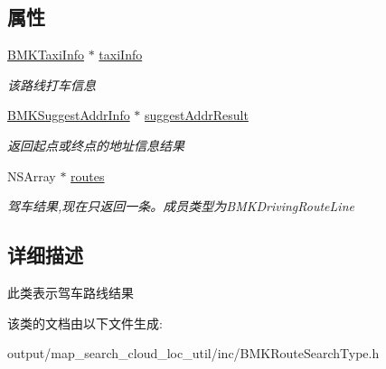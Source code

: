 \subsection*{属性}
\begin{DoxyCompactItemize}
\item 
\hypertarget{interface_b_m_k_driving_route_result_a4dc537f67ed47de78ac3bcda172397dd}{\hyperlink{interface_b_m_k_taxi_info}{B\+M\+K\+Taxi\+Info} $\ast$ \hyperlink{interface_b_m_k_driving_route_result_a4dc537f67ed47de78ac3bcda172397dd}{taxi\+Info}}\label{interface_b_m_k_driving_route_result_a4dc537f67ed47de78ac3bcda172397dd}

\begin{DoxyCompactList}\small\item\em 该路线打车信息 \end{DoxyCompactList}\item 
\hypertarget{interface_b_m_k_driving_route_result_adf554437aec4884ae9fdc7cdb8fc2625}{\hyperlink{interface_b_m_k_suggest_addr_info}{B\+M\+K\+Suggest\+Addr\+Info} $\ast$ \hyperlink{interface_b_m_k_driving_route_result_adf554437aec4884ae9fdc7cdb8fc2625}{suggest\+Addr\+Result}}\label{interface_b_m_k_driving_route_result_adf554437aec4884ae9fdc7cdb8fc2625}

\begin{DoxyCompactList}\small\item\em 返回起点或终点的地址信息结果 \end{DoxyCompactList}\item 
\hypertarget{interface_b_m_k_driving_route_result_a448147e99f71f6bf82c93a51dd2d4b81}{N\+S\+Array $\ast$ \hyperlink{interface_b_m_k_driving_route_result_a448147e99f71f6bf82c93a51dd2d4b81}{routes}}\label{interface_b_m_k_driving_route_result_a448147e99f71f6bf82c93a51dd2d4b81}

\begin{DoxyCompactList}\small\item\em 驾车结果,现在只返回一条。成员类型为\+B\+M\+K\+Driving\+Route\+Line \end{DoxyCompactList}\end{DoxyCompactItemize}


\subsection{详细描述}
此类表示驾车路线结果 

该类的文档由以下文件生成\+:\begin{DoxyCompactItemize}
\item 
output/map\+\_\+search\+\_\+cloud\+\_\+loc\+\_\+util/inc/B\+M\+K\+Route\+Search\+Type.\+h\end{DoxyCompactItemize}
